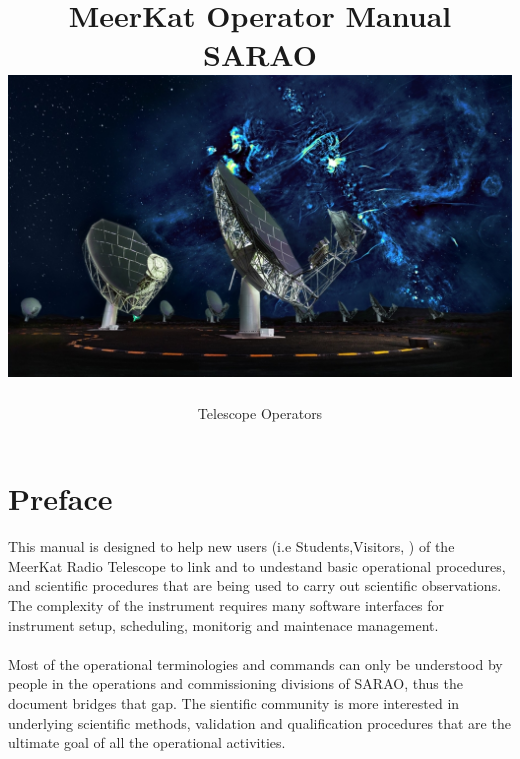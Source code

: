 \documentclass[12pt]{report}
\title{
	{MeerKat Operator Manual}\\
	{\large SARAO}\\
	\vspace{1.5cm}
	{\includegraphics[width=16cm]{cover.jpg}}
}
\author{Telescope Operators}
\date{}
\begin{document}
\maketitle
 
 
 \chapter*{Preface}

This manual is designed to help new users (i.e Students,Visitors, ) of the MeerKat Radio Telescope\cite{} to link and to undestand basic operational procedures\cite{}, and scientific procedures\cite{} that are being used to carry out scientific observations.  The complexity of the instrument requires many software interfaces for instrument setup, scheduling, monitorig and maintenace management. \\
\\
 Most of the operational terminologies and commands can only be understood by people in the operations and commissioning divisions of SARAO, thus the document bridges that gap.  The sientific community is more interested in underlying scientific methods, validation and qualification procedures that are the ultimate goal of all the operational activities.  
 
\end{document}
